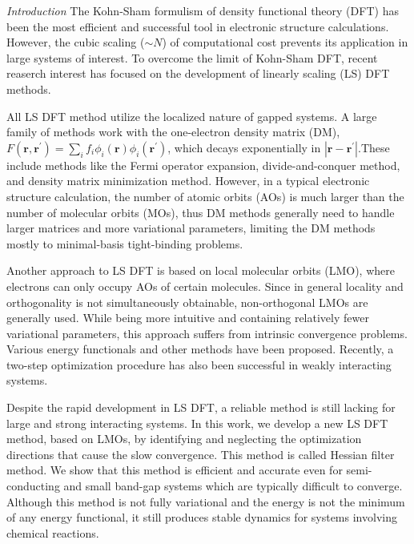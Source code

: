 \documentclass[prl,twocolumn,showpacs]{revtex4}
\begin{document}
\emph{Introduction} 
The Kohn-Sham formulism of density functional theory (DFT)\cite{hohenberg1964inhomogeneous,kohn1965self} has been the most efficient and successful tool in electronic structure calculations. However, the cubic scaling ($\sim N$) of computational cost prevents its application in large systems of interest. To overcome the limit of Kohn-Sham DFT, recent reaserch interest has focused on the development of linearly scaling (LS) DFT methods\cite{bowler2012methods,goedecker1999linear}. 

All LS DFT method utilize the localized nature of gapped systems. A large family of methods work with the one-electron density matrix (DM)\cite{li1993density,lee1996linear,li2003density,vandevondele2012linear}, $F(\mathbf{r},\mathbf{r}^{'})=\sum_i f_i \phi_i(\mathbf{r}) \phi_i(\mathbf{r}^{'})$, which decays exponentially in $|\mathbf{r}-\mathbf{r}^{'}|$.These include methods like the Fermi operator expansion\cite{goedecker1994efficient,goedecker1995tight}, divide-and-conquer method\cite{yang1991direct,yang1991local}, and density matrix minimization method\cite{li1993density}. However, in a typical electronic structure calculation, the number of atomic orbits (AOs) is much larger than the number of molecular orbits (MOs), thus DM methods generally need to handle larger matrices and more variational parameters, limiting the DM methods mostly to minimal-basis tight-binding problems. 

Another approach to LS DFT is based on local molecular orbits (LMO), where electrons can only occupy AOs of certain molecules. Since in general locality and orthogonality is not simultaneously obtainable, non-orthogonal LMOs are generally used. While being more intuitive and containing relatively fewer variational parameters, this approach suffers from intrinsic convergence problems\cite{ordejon1995linear,fattebert2004linear}. Various energy functionals and other methods have been proposed\cite{kim1995total}. Recently, a two-step optimization procedure has also been successful in weakly interacting systems\cite{khaliullin2013efficient}. 

Despite the rapid development in LS DFT, a reliable method is still lacking for large and strong interacting systems. In this work, we develop a new LS DFT method, based on LMOs, by identifying and neglecting the optimization directions that cause the slow convergence. This method is called Hessian filter method. We show that this method is efficient and accurate even for semi-conducting and small band-gap systems which are typically difficult to converge. Although this method is not fully variational and the energy is not the minimum of any energy functional, it still produces stable dynamics for systems involving chemical reactions. 
\end{document}
